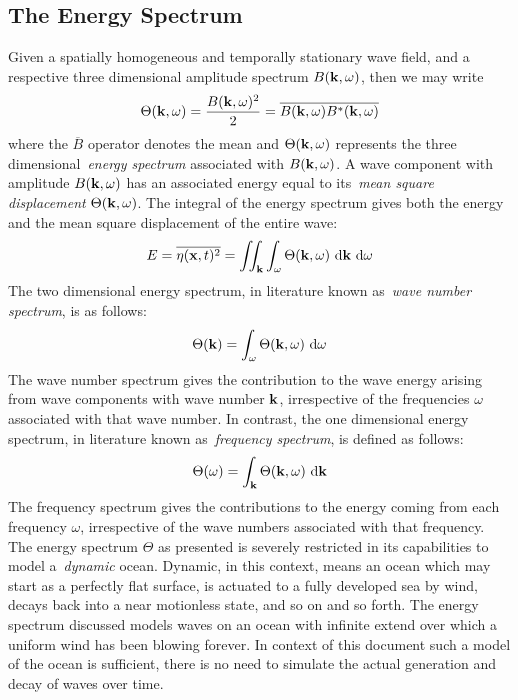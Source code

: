\subsection{The Energy Spectrum}
\label{sec:energy_spectrum}
Given a spatially homogeneous and temporally stationary wave field, and a
respective three dimensional amplitude spectrum $B(\mathbf{k},\omega)$, then we
may write
\begin{equation}
\label{eq:energy_spectrum_3d}
 \Theta(\mathbf{k}, \omega) = \frac{B(\mathbf{k}, \omega)^2}{2} = 
\overline{B(\mathbf{k}, \omega)B^{*}(\mathbf{k}, \omega)}
\end{equation}
where the $\overline{B}$ operator denotes the mean and 
$\Theta(\mathbf{k},\omega)$ represents the three dimensional~\emph{energy
spectrum} associated with $B(\mathbf{k},\omega)$. A wave component with amplitude
$B(\mathbf{k}, \omega)$ has an associated energy equal to its~\emph{mean square
displacement} $\Theta(\mathbf{k},\omega)$. The integral of the energy spectrum
gives both the energy and the mean square displacement of the entire wave:
%
\begin{equation}
\label{eq:wave_energy_3d}
 E = \overline{\eta(\mathbf{x}, t)^2} = \iint_{\mathbf{k}}\int_{\omega}
\Theta(\mathbf{k},
\omega)~\mathrm{d}\mathbf{k}~\mathrm{d}\omega
\end{equation}
%
The two dimensional energy spectrum, in literature known as~\emph{wave number
spectrum}, is as follows:
\begin{equation}
\label{eq:energy_spectrum_2d}
 \Theta(\mathbf{k}) = \int_{\omega} \Theta(\mathbf{k}, \omega)~\mathrm{d}\omega
\end{equation}
The wave number spectrum gives the contribution to the wave energy arising from
wave components with wave number $\mathbf{k}$, irrespective of the frequencies
$\omega$ associated with that wave number. In contrast, the one dimensional
energy spectrum, in literature known as~\emph{frequency spectrum}, is defined
as follows:
\begin{equation}
\label{eq:energy_spectrum_1d}
 \Theta(\omega) = \int_{\mathbf{k}} \Theta(\mathbf{k}, \omega)~\mathrm{d}\mathbf{k}
\end{equation}
The frequency spectrum gives the contributions to the energy coming from each
frequency $\omega$, irrespective of the wave numbers associated with that
frequency.\\

The energy spectrum $\Theta$ as presented is severely restricted in its
capabilities to model a~\emph{dynamic} ocean. Dynamic, in this context, means an
ocean which may start as a perfectly flat surface, is actuated to a fully
developed sea by wind, decays back into a near motionless state, and so on and
so forth. The energy spectrum discussed models waves on an ocean with infinite
extend over which a uniform wind has been blowing forever. In context of this
document such a model of the ocean is sufficient, there is no need to simulate
the actual generation and decay of waves over time.

